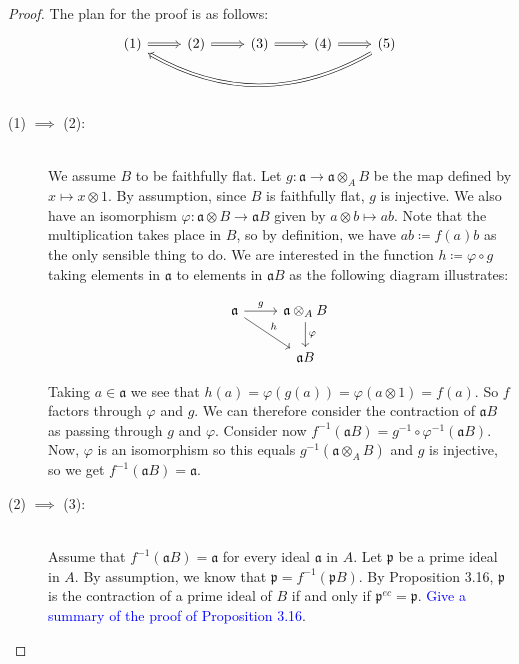 \documentclass{article}
\newcommand{\p}{\mathfrak{p}}
\newcommand{\tensor}{\otimes}
\renewcommand{\a}{\mathfrak{a}}
\begin{document}
    \begin{proof} The plan for the proof is as follows:
        \begin{equation}
            \notag
            \begin{tikzcd}
                (1) \ar[r, Rightarrow] & (2) \ar[r, Rightarrow] & (3) \ar[r, Rightarrow] & (4) \ar[r, Rightarrow] & (5) \ar[llll, bend left, Rightarrow]\\
            \end{tikzcd}
        \end{equation}

        \begin{description}
            \item[(1) $\implies$ (2):]\hfill \\ We assume $B$ to be
                faithfully flat. Let $g\colon \a \to \a \tensor_A B$ be
                the map defined by $x \mapsto x \tensor 1$.  By
                assumption, since $B$ is faithfully flat, $g$ is
                injective. We also have an isomorphism $\varphi \colon \a
                \tensor B \to \a B$ given by $a\tensor b \mapsto ab$. Note
                that the multiplication takes place in $B$, so by
                definition, we have $ab \coloneqq f(a)b$ as the only
                sensible thing to do. We are interested in the function $h
                \coloneqq \varphi \circ g$ taking elements in $\a$ to
                elements in $\a B$ as the following diagram illustrates:

            \begin{equation}
                \notag
                \begin{tikzcd}
                    \a \ar[r, "g"] \ar[dr, "h"] & \a \tensor_A B \ar[d, "\varphi"]\\
                    & \a B
                \end{tikzcd}
            \end{equation}

            Taking $a \in \a$ we see that $h(a) = \varphi(g(a)) = \varphi(a
            \tensor 1) = f(a)$. So $f$ factors through $\varphi$ and $g$. We
            can therefore consider the contraction of $\a B$ as passing through
            $g$ and $\varphi$. Consider now $f^{-1}(\a B) = g^{-1}\circ
            \varphi^{-1} (\a B)$. Now, $\varphi$ is an isomorphism so this
            equals $g^{-1}(\a \tensor_A B)$ and $g$ is injective, so we get
            $f^{-1}(\a B) = \a$.
    
            \item[(2) $\implies$ (3):]\hfill \\
                Assume that $f^{-1}(\a B) = \a$ for every ideal $\a$ in $A$.
                Let $\p$ be a prime ideal in $A$. By assumption, we know that
                $\p = f^{-1}(\p B)$. By Proposition 3.16, $\p$ is the
                contraction of a prime ideal of $B$ if and only if $\p^{ec} =
                \p$. \textcolor{blue}{Give a summary of the proof of
                Proposition 3.16}.


\end{description}
\end{proof}
\end{document}
